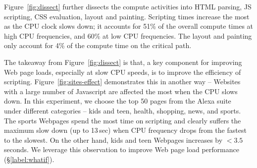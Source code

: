 Figure~\ref{fig:dissect} further dissects the compute activities into HTML parsing, JS scripting, CSS evaluation, layout and painting. 
Scripting times increase the most as the CPU clock slows down; it accounts for 51\% of the overall compute times at high CPU frequencies, and 60\% at low CPU frequencies. The layout and painting only account for 4\% of the compute time on the critical path. 

The  takeaway from Figure~\ref{fig:dissect} is that, a key component for improving Web page loads, especially at slow CPU speeds, is to  improve the efficiency of scripting. 
%
Figure~\ref{fig:sites-effect} demonstrates
this in another way -- Websites with a large number of Javascript are affected the most when the CPU slows down. In this experiment, we choose the top 50 pages from the  Alexa suite~\cite{alexa} under different categories -- kids and teen, health, shopping, news, and sports. 
The sports Webpages spend the most time on scripting and clearly suffers the maximum slow down (up to 13\,sec) when CPU frequency drops from the fastest
to the slowest. On the other hand, kids and teen Webpages increases by $<3.5$ seconds. We leverage this observation to improve Web page load performance (\S\ref{label:whatif}).
